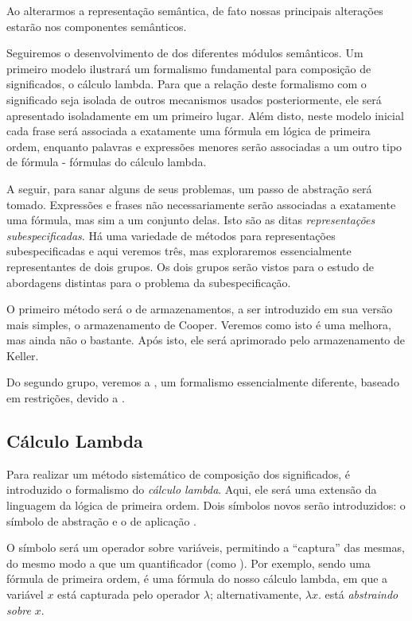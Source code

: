 	Ao alterarmos a representação semântica, de fato nossas principais alterações estarão nos componentes semânticos.
	
	Seguiremos o desenvolvimento de \citet{BlackburnBos:2005} dos diferentes módulos semânticos. Um primeiro modelo ilustrará um formalismo fundamental para composição de significados, o cálculo lambda. Para que a relação deste formalismo com o significado seja isolada de outros mecanismos usados posteriormente, ele será apresentado isoladamente em um primeiro lugar. Além disto, neste modelo inicial cada frase será associada a exatamente uma fórmula em lógica de primeira ordem, enquanto palavras e expressões menores serão associadas a um outro tipo de fórmula - fórmulas do cálculo lambda.
	
	A seguir, para sanar alguns de seus problemas, um passo de abstração será tomado. Expressões e frases não necessariamente serão associadas a exatamente uma fórmula, mas sim a um conjunto delas. Isto são as ditas \textit{representações subespecificadas}. Há uma variedade de métodos para representações subespecificadas e aqui veremos três, mas exploraremos essencialmente representantes de dois grupos. Os dois grupos serão vistos para o estudo de abordagens distintas para o problema da subespecificação. \citep[p.~150--153]{BlackburnBos:2005}
	
	O primeiro método será o de armazenamentos, a ser introduzido em sua versão mais simples, o armazenamento de Cooper. Veremos como isto é uma melhora, mas ainda não o bastante. Após isto, ele será aprimorado pelo armazenamento de Keller.
	
	Do segundo grupo, veremos a , um formalismo essencialmente diferente, baseado em restrições, devido a \citet{HoleSem}.


\subsection{Cálculo Lambda}

Para realizar um método sistemático de composição dos significados, é introduzido o formalismo do \textit{cálculo lambda}. Aqui, ele será uma extensão da linguagem da lógica de primeira ordem. Dois símbolos novos serão introduzidos: o símbolo de abstração \expr{$\lambda$} e o de aplicação .

O símbolo \expr{$\lambda$} será um operador sobre variáveis, permitindo a ``captura'' das mesmas, do mesmo modo a que um quantificador (como \expr{$\forall$}). Por exemplo, sendo  uma fórmula de primeira ordem,  é uma fórmula do nosso cálculo lambda, em que a variável $x$ está capturada pelo operador $\lambda$; alternativamente, $\lambda x.$ está \textsl{abstraindo sobre} $x$. 

